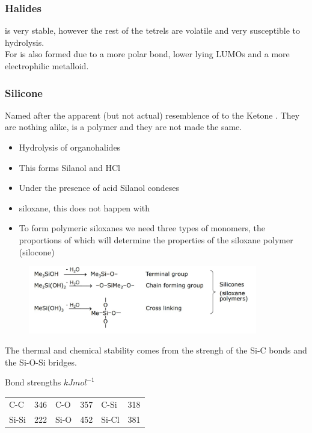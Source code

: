 \documentclass{article}
\begin{document}
    \subsubsection{Halides}
   
     is very stable, however the rest of the tetrels are volatile and very susceptible to hydrolysis.
    \\
    For   is also formed due to a more polar bond, lower lying LUMOs and a more electrophilic metalloid.

    \subsubsection{Silicone}

    Named after the apparent (but not actual) resemblence of  to the Ketone .
    They are nothing alike,  is a polymer and they are not made the same.

    \begin{itemize}
        \item Hydrolysis of organohalides
        \item {} This forms Silanol and HCl
        \item Under the presence of acid Silanol condeses
        \item {} siloxane, this does not happen with 
        \item To form polymeric siloxanes we need three types of monomers, the proportions of which will determine the properties of the siloxane polymer (silocone)
    \end{itemize}

    \begin{figure}[h]
        \centering
        \includegraphics[width=10cm]{siloxanes.jpg}
    \end{figure}
    
    The thermal and chemical stability comes from the strengh of the Si-C bonds and the Si-O-Si bridges.

    Bond strengths $kJmol^{-1}$
    \begin{tabular}{l l l l l l}
        C-C & 346 & C-O & 357 & C-Si & 318\\
        Si-Si & 222 & Si-O & 452 & Si-Cl & 381
    \end{tabular}
\end{document}
